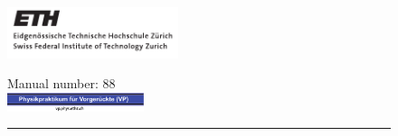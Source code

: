 \begin{figure}
	\begin{minipage}{0.5\linewidth}\flushleft
		\includegraphics[width=5cm]{ethlogo_black-eps-converted-to.pdf}
	\end{minipage}
	\hspace{0.05cm}
	\begin{minipage}{0.5\linewidth}\flushright
		Manual number: 88 \hspace{2cm}\\[0.5cm]
		\includegraphics[width=4cm]{VP-Logo-eps-converted-to.pdf}
	\end{minipage}
	\hrule height 1pt\hfill \\[3cm]
\end{figure}

\maketitle
